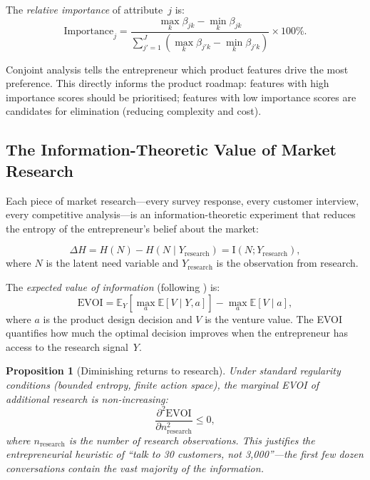 \documentclass[12pt,a4paper,oneside]{book}
\newtheorem{proposition}[theorem]{Proposition}
\theoremstyle{definition}
\theoremstyle{remark}
\newcommand{\E}{\mathbb{E}}
\newcommand{\MI}{\mathrm{I}}
\begin{document}
The \emph{relative importance} of attribute~$j$ is:
\begin{equation}\label{eq:importance}
  \text{Importance}_j = \frac{\max_k \beta_{jk} - \min_k \beta_{jk}}
    {\sum_{j'=1}^J (\max_k \beta_{j'k} - \min_k \beta_{j'k})} \times 100\%.
\end{equation}

\begin{practicalimplication}
Conjoint analysis tells the entrepreneur which product features drive the most
preference. This directly informs the product roadmap: features with high importance
scores should be prioritised; features with low importance scores are candidates for
elimination (reducing complexity and cost).
\end{practicalimplication}

\subsection{The Information-Theoretic Value of Market Research}

Each piece of market research---every survey response, every customer interview, every
competitive analysis---is an information-theoretic experiment that reduces the entropy
of the entrepreneur's belief about the market:

\begin{equation}\label{eq:research_value}
  \Delta H = H(N) - H(N \mid Y_{\text{research}})
  = \MI(N; Y_{\text{research}}),
\end{equation}
where $N$ is the latent need variable and $Y_{\text{research}}$ is the observation from
research.

The \emph{expected value of information} (following \citet{Howard1966}) is:
\begin{equation}\label{eq:evoi}
  \text{EVOI} = \E_{Y}\!\left[\max_a \E[V \mid Y, a]\right]
    - \max_a \E[V \mid a],
\end{equation}
where $a$ is the product design decision and $V$ is the venture value. The EVOI
quantifies how much the optimal decision improves when the entrepreneur has access to
the research signal~$Y$.

\begin{proposition}[Diminishing returns to research]\label{prop:diminishing_research}
Under standard regularity conditions (bounded entropy, finite action space), the
marginal EVOI of additional research is non-increasing:
\begin{equation}\label{eq:diminishing}
  \frac{\partial^2 \text{EVOI}}{\partial n_{\text{research}}^2} \leq 0,
\end{equation}
where $n_{\text{research}}$ is the number of research observations. This justifies the
entrepreneurial heuristic of ``talk to 30 customers, not 3,000''---the first few
dozen conversations contain the vast majority of the information.
\end{proposition}
\end{document}
